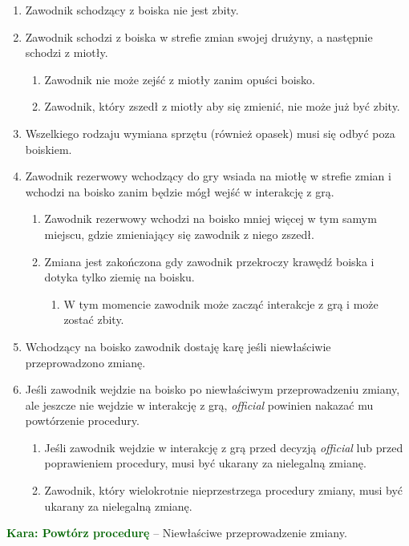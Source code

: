 \documentclass[11pt,a4paper]{article}
\newcommand\penaltyd[2]{\bgroup\textcolor{darkgreen}{\textbf{Kara: #1}} -- #2}
\begin{document}
\begin{enumerate}
  \item Zawodnik schodzący z boiska nie jest zbity.
  \item Zawodnik schodzi z boiska w strefie zmian swojej drużyny, a następnie schodzi z miotły.
  \begin{enumerate}
    \item Zawodnik nie może zejść z miotły zanim opuści boisko.
    \item Zawodnik, który zszedł z miotły aby się zmienić, nie może już być zbity.
  \end{enumerate}
  \item Wszelkiego rodzaju wymiana sprzętu (również opasek) musi się odbyć poza boiskiem.
  \item Zawodnik rezerwowy wchodzący do gry wsiada na miotłę w strefie zmian i wchodzi na boisko zanim będzie mógł wejść w interakcję z grą.
  \begin{enumerate}
    \item Zawodnik rezerwowy wchodzi na boisko mniej więcej w tym samym miejscu, gdzie zmieniający się zawodnik z niego zszedł.
    \item Zmiana jest zakończona gdy zawodnik przekroczy krawędź boiska i dotyka tylko ziemię na boisku.
    \begin{enumerate}
      \item W tym momencie zawodnik może zacząć interakcje z grą i może zostać zbity.
    \end{enumerate}
  \end{enumerate}
  \item Wchodzący na boisko zawodnik dostaję karę jeśli niewłaściwie przeprowadzono zmianę.
  \item Jeśli zawodnik wejdzie na boisko po niewłaściwym przeprowadzeniu zmiany, ale jeszcze nie wejdzie w interakcję z grą, \emph{official} powinien nakazać mu powtórzenie procedury.
  \begin{enumerate}
    \item Jeśli zawodnik wejdzie w interakcję z grą przed decyzją \emph{official} lub przed poprawieniem procedury, musi być ukarany za nielegalną zmianę.
    \item Zawodnik, który wielokrotnie nieprzestrzega procedury zmiany, musi być ukarany za nielegalną zmianę.
  \end{enumerate}
\end{enumerate}

\penaltyd{Powtórz procedurę}{Niewłaściwe przeprowadzenie zmiany.}
\end{document}
